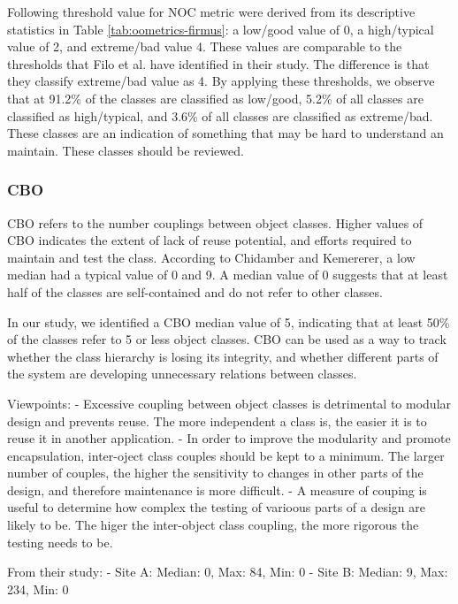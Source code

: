 Following threshold value for NOC metric were derived from its descriptive statistics in Table \ref{tab:oometrics-firmus}: a low/good value of 0, a high/typical value of 2, and extreme/bad value 4. These values are comparable to the thresholds that Filo et al.\cite{tarcisio} have identified in their study. The difference is that they classify extreme/bad value as 4. By applying these thresholds, we observe that at 91.2\% of the classes are classified as low/good, 5.2\% of all classes are classified as high/typical, and 3.6\% of all classes are classified as extreme/bad. These classes are an indication of something that may be hard to understand an maintain. These classes should be reviewed.




\subsubsection{CBO}
CBO refers to the number couplings between object classes. Higher values of CBO indicates the extent of lack of reuse potential, and efforts required to maintain and test the class. According to Chidamber and Kemererer\cite{chidamber1994metrics}, a low median had a typical value of 0 and 9. A median value of 0 suggests that at least half of the classes are self-contained and do not refer to other classes.

In our study, we identified a CBO median value of 5, indicating that at least 50\% of the classes refer to 5 or less object classes. CBO can be used as a way to track whether the class hierarchy is losing its integrity, and whether different parts of the system are developing unnecessary relations between classes.







Viewpoints:
- Excessive coupling between object classes is detrimental to modular design and prevents reuse. The more independent a class is, the easier it is to reuse it in another application.
- In order to improve the modularity and promote encapsulation, inter-oject class couples should be kept to a minimum. The larger number of couples, the higher the sensitivity to changes in other parts of the design, and therefore maintenance is more difficult.
- A measure of couping is useful to determine how complex the testing of varioous parts of a design are likely to be. The higer the inter-object class coupling, the more rigorous the testing needs to be.

From their study:
- Site A: Median: 0, Max: 84, Min: 0
- Site B: Median: 9, Max: 234, Min: 0




